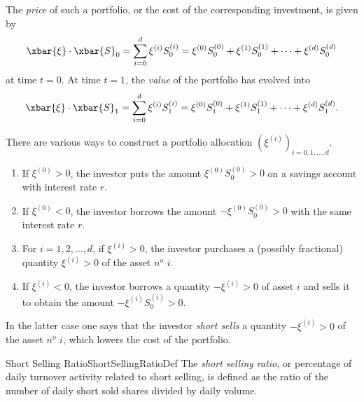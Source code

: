\noindent The \textit{price} of such a portfolio, or the cost of the corresponding investment, is given by
\begin{equation} \label{eq:PortfolioPriceT0}
    \xbar{\xi} \cdot \xbar{S}_0 = \sum_{i=0}^d \xi^{(i)} S_0^{(i)} = \xi^{(0)} S_0^{(0)} + \xi^{(1)} S_0^{(1)} + \dots + \xi^{(d)} S_0^{(d)}
\end{equation}
at time \(t=0\). At time \(t=1\), the \textit{value} of the portfolio has evolved into
\begin{equation} \label{eq:PortfolioValueT1}
    \xbar{\xi} \cdot \xbar{S}_1 = \sum_{i=0}^d \xi^{(i)} S_1^{(i)} = \xi^{(0)} S_1^{(0)} + \xi^{(1)} S_1^{(1)} + \dots + \xi^{(d)} S_1^{(d)}.
\end{equation}

\noindent There are various ways to construct a portfolio allocation \((\xi^{(i)})_{i=0,1,\dots,d}\).

\begin{enumerate}[label=\roman*), leftmargin=*, parsep=6pt]
    \item If \(\xi^{(0)} > 0\), the investor puts the amount \(\xi^{(0)} S_0^{(0)} > 0\) on a savings account with interest rate \(r\).

    \item If \(\xi^{(0)} < 0\), the investor borrows the amount \(-\xi^{(0)} S_0^{(0)} > 0\) with the same interest rate \(r\).

    \item For \(i = 1, 2, \dots, d\), if \(\xi^{(i)} > 0\), the investor purchases a (possibly fractional) quantity \(\xi^{(i)} > 0\) of the asset \(n^o\) \(i\).

    \item If \(\xi^{(i)} < 0\), the investor borrows a quantity \(-\xi^{(i)} > 0\) of asset \(i\) and sells it to obtain the amount \(-\xi^{(i)} S_0^{(i)} > 0\).
\end{enumerate}

\noindent In the latter case one says that the investor \textit{short sells} a quantity \(-\xi^{(i)} > 0\) of the asset \(n^o\) \(i\), which lowers the cost of the portfolio.

\begin{defn}{Short Selling Ratio}{ShortSellingRatioDef}
    The \textit{short selling ratio}, or percentage of daily turnover activity related to short selling, is defined as the ratio of the number of daily short sold shares divided by daily volume.
\end{defn}

